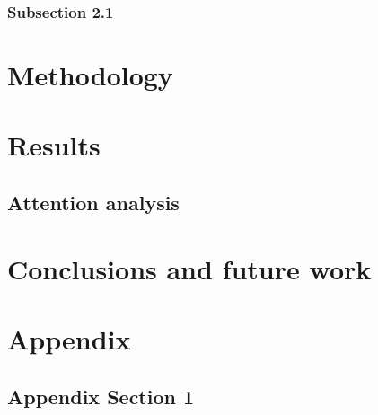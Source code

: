 \documentclass[a4paper,12p, twoside]{report}
\begin{document}
\subsection{Subsection 2.1}
\label{sec:subsec_1}
% 
% 
\chapter{Methodology}
\label{chap:methodology}
% 
% 
\chapter{Results}
\label{chap:results}
\section{Attention analysis}
\label{sec:attention_analysis}
% 
% 
\chapter{Conclusions and future work}
\label{chap:conclusions}
% 
% 
\chapter*{Appendix}
\label{chap:appendix}
\section*{Appendix Section 1}
\label{sec:app_sec}

%
%

% 
\end{document}
